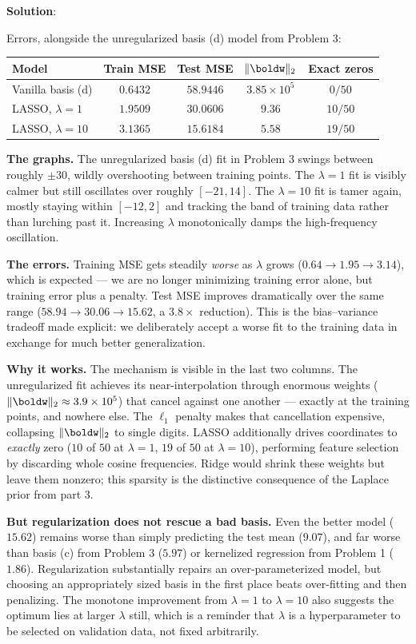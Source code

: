 \documentclass[submit]{../harvardml}
\newenvironment{solution}{
    \vspace{2mm}
    \color{blue}\noindent\textbf{Solution}:
}{}
\begin{document}
\begin{solution}
\begin{enumerate}
\noindent Errors, alongside the unregularized basis (d) model from Problem 3:
\begin{center}
\begin{tabular}{lcccc}
  \hline
  Model & Train MSE & Test MSE & $\|\boldw\|_2$ & Exact zeros \\
  \hline
  Vanilla basis (d)      & $0.6432$ & $58.9446$ & $3.85\times 10^{5}$ & $0/50$ \\
  LASSO, $\lambda = 1$   & $1.9509$ & $30.0606$ & $9.36$  & $10/50$ \\
  LASSO, $\lambda = 10$  & $3.1365$ & $\mathbf{15.6184}$ & $5.58$  & $19/50$ \\
  \hline
\end{tabular}
\end{center}

\textbf{The graphs.} The unregularized basis (d) fit in Problem 3 swings between
roughly $\pm 30$, wildly overshooting between training points. The $\lambda = 1$
fit is visibly calmer but still oscillates over roughly $[-21, 14]$. The
$\lambda = 10$ fit is tamer again, mostly staying within $[-12, 2]$ and tracking
the band of training data rather than lurching past it. Increasing $\lambda$
monotonically damps the high-frequency oscillation.

\textbf{The errors.} Training MSE gets steadily \emph{worse} as $\lambda$ grows
($0.64 \to 1.95 \to 3.14$), which is expected --- we are no longer minimizing
training error alone, but training error plus a penalty. Test MSE improves
dramatically over the same range ($58.94 \to 30.06 \to 15.62$, a $3.8\times$
reduction). This is the bias--variance tradeoff made explicit: we deliberately
accept a worse fit to the training data in exchange for much better
generalization.

\textbf{Why it works.} The mechanism is visible in the last two columns. The
unregularized fit achieves its near-interpolation through enormous weights
($\|\boldw\|_2 \approx 3.9\times10^5$) that cancel against one another --- exactly
at the training points, and nowhere else. The $\ell_1$ penalty makes that
cancellation expensive, collapsing $\|\boldw\|_2$ to single digits. LASSO
additionally drives coordinates to \emph{exactly} zero ($10$ of $50$ at
$\lambda=1$, $19$ of $50$ at $\lambda=10$), performing feature selection by
discarding whole cosine frequencies. Ridge would shrink these weights but leave
them nonzero; this sparsity is the distinctive consequence of the Laplace prior
from part 3.

\textbf{But regularization does not rescue a bad basis.} Even the better model
($15.62$) remains worse than simply predicting the test mean ($9.07$), and far
worse than basis (c) from Problem 3 ($5.97$) or kernelized regression from
Problem 1 ($1.86$). Regularization substantially repairs an over-parameterized
model, but choosing an appropriately sized basis in the first place beats
over-fitting and then penalizing. The monotone improvement from $\lambda = 1$ to
$\lambda = 10$ also suggests the optimum lies at larger $\lambda$ still, which
is a reminder that $\lambda$ is a hyperparameter to be selected on validation
data, not fixed arbitrarily.


\end{enumerate}
\end{solution}
\end{document}
